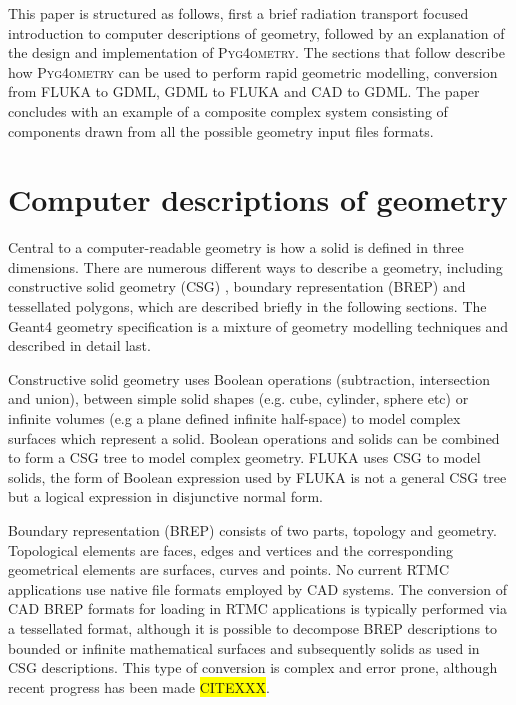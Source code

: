 \documentclass[final,5p,times,twocolumn]{elsarticle}
\newcommand{\PYGEOMETRY}{\textsc{Pyg4ometry}}
\begin{document}
This paper is structured as follows, first a brief radiation transport focused introduction to computer descriptions of geometry, followed by an explanation of the design and implementation of \PYGEOMETRY{}. The sections that follow describe how \PYGEOMETRY{} can be used to perform rapid geometric modelling, conversion from FLUKA to GDML, GDML to FLUKA and CAD to GDML. The paper concludes with an example of a composite complex system consisting of components drawn from all the possible geometry input files formats.

\section{Computer descriptions of geometry} \label{sec:geometric}
Central to a computer-readable geometry is how a solid is defined in three dimensions. There are numerous different ways to describe a
geometry, including constructive solid geometry (CSG) , boundary representation (BREP) and tessellated polygons, which are described 
briefly in the following sections.  The Geant4 geometry specification is a mixture of geometry modelling techniques and described in detail last.

Constructive solid geometry uses Boolean operations (subtraction, intersection and union), between simple solid shapes (e.g. cube, cylinder, sphere etc) or infinite
volumes (e.g a plane defined infinite half-space) to model complex surfaces which represent a solid. Boolean operations and solids can be combined to form a 
CSG tree to model complex geometry. FLUKA uses CSG to model solids, the form of Boolean expression used by FLUKA is not a general CSG tree but a 
logical expression in disjunctive normal form.

Boundary representation (BREP) consists of two parts, topology and geometry. Topological elements are faces, edges and vertices and the corresponding
geometrical elements are surfaces, curves and points. No current RTMC applications use native file formats employed by CAD systems. The conversion of 
CAD BREP formats for loading in RTMC applications is typically performed via a tessellated format, although it is possible to decompose BREP descriptions
 to bounded or infinite mathematical surfaces and subsequently solids as used in CSG descriptions. This type of conversion is complex and error prone, 
 although recent progress has been made \colorbox{yellow}{CITEXXX}.
\end{document}
